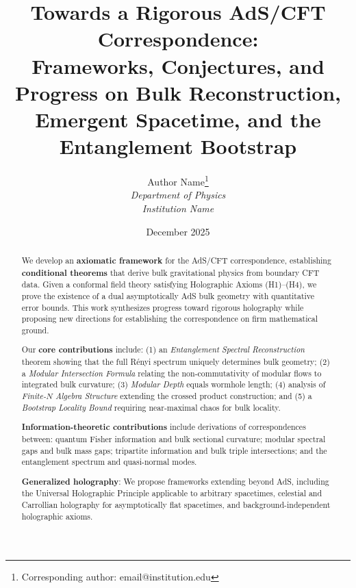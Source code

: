 \documentclass[12pt,a4paper]{article}
\title{\textbf{Towards a Rigorous AdS/CFT Correspondence:\\
Frameworks, Conjectures, and Progress on Bulk Reconstruction, Emergent Spacetime, and the Entanglement Bootstrap}}
\author{Author Name\thanks{Corresponding author: email@institution.edu}\\
\textit{Department of Physics}\\
\textit{Institution Name}}
\date{December 2025}
\begin{document}
\maketitle

\begin{abstract}
We develop an \textbf{axiomatic framework} for the AdS/CFT correspondence, establishing \textbf{conditional theorems} that derive bulk gravitational physics from boundary CFT data. Given a conformal field theory satisfying Holographic Axioms (H1)--(H4), we prove the existence of a dual asymptotically AdS bulk geometry with quantitative error bounds. This work synthesizes progress toward rigorous holography while proposing new directions for establishing the correspondence on firm mathematical ground.

Our \textbf{core contributions} include: (1) an \emph{Entanglement Spectral Reconstruction} theorem showing that the full R\'enyi spectrum uniquely determines bulk geometry; (2) a \emph{Modular Intersection Formula} relating the non-commutativity of modular flows to integrated bulk curvature; (3) \emph{Modular Depth} equals wormhole length; (4) analysis of \emph{Finite-$N$ Algebra Structure} extending the crossed product construction; and (5) a \emph{Bootstrap Locality Bound} requiring near-maximal chaos for bulk locality.

\textbf{Information-theoretic contributions} include derivations of correspondences between: quantum Fisher information and bulk sectional curvature; modular spectral gaps and bulk mass gaps; tripartite information and bulk triple intersections; and the entanglement spectrum and quasi-normal modes.

\textbf{Generalized holography}: We propose frameworks extending beyond AdS, including the Universal Holographic Principle applicable to arbitrary spacetimes, celestial and Carrollian holography for asymptotically flat spacetimes, and background-independent holographic axioms.


\end{abstract}
\end{document}

